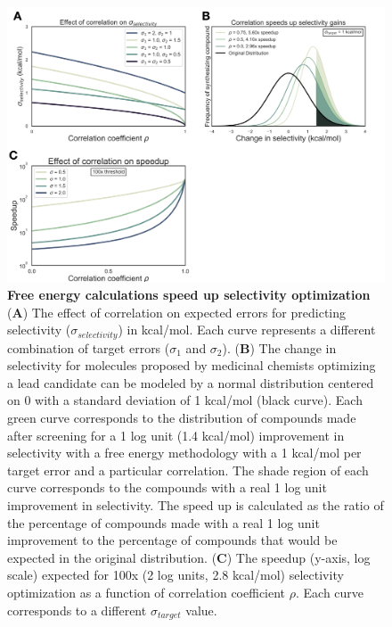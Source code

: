 \documentclass[9pt,lineno]{elife-modified} %
\begin{document}
\begin{figure}
\begin{fullwidth}
\begin{centering}
\includegraphics[width=1.0\linewidth]{figures/figure1.png}
\end{centering}
\caption{
\label{fig:figure-1}
{\bf Free energy calculations speed up selectivity optimization} \\
({\bf A})  The effect of correlation on expected errors for predicting selectivity ($\sigma_{selectivity}$) in kcal/mol. Each curve represents a different combination of target errors ($\sigma_1$ and $\sigma_2$). 
({\bf B}) The change in selectivity for molecules proposed by medicinal chemists optimizing a lead candidate can be modeled by a normal distribution centered on 0 with a standard deviation of 1 kcal/mol (black curve). Each green curve corresponds to the distribution of compounds made after screening for a 1 log unit (1.4 kcal/mol) improvement in selectivity with a free energy methodology with a 1 kcal/mol per target error and a particular correlation. The shade region of each curve corresponds to the compounds with a real 1 log unit  improvement in selectivity. The speed up is calculated as the ratio of the percentage of compounds made with a real 1 log unit improvement to the percentage of compounds that would be expected in the original distribution.  
({\bf C}) The speedup (y-axis, log scale) expected for 100x (2 log units, 2.8 kcal/mol) selectivity optimization as a function of correlation coefficient $\rho$. Each curve corresponds to a different $\sigma_{target}$ value.  
}
\end{fullwidth}
\end{figure}
\end{document}
